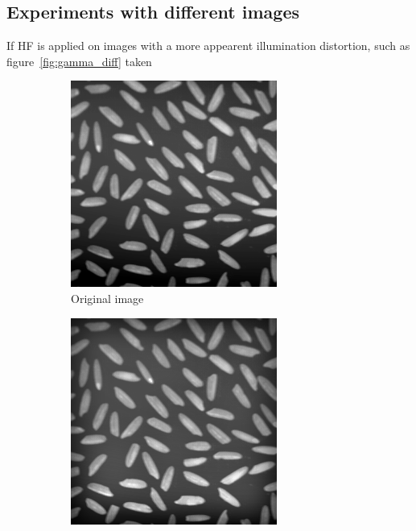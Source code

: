 		\subsection{Experiments with different images}
		\label{chap:experiments}
		If HF is applied on images with a more appearent
		illumination distortion, such as figure~\ref{fig:gamma_diff} taken
		\begin{figure}[h!]
      \centering
				\begin{subfigure}[b]{0.5\linewidth}
          \includegraphics[width=0.9\linewidth]{pics/microbes_before.png}
          \caption{Original image}
          \label{fig:microbe_before}
        \end{subfigure}%
        \begin{subfigure}[b]{0.5\linewidth}
          \includegraphics[width=0.9\linewidth]{pics/microbes_after.png}

\end{subfigure}
\end{figure}
